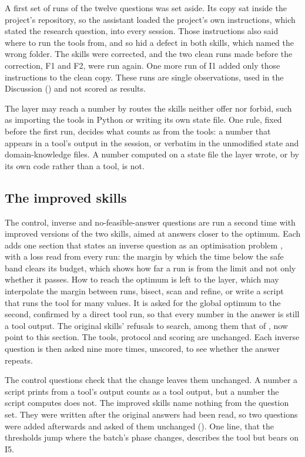   A first set of runs of the twelve questions was set aside. Its copy sat inside the project's
  repository, so the assistant loaded the project's own instructions, which stated the research
  question, into every session. Those instructions also said where to run the tools from, and so
  hid a defect in both skills, which named the wrong folder. The skills were corrected, and the
  two clean runs made before the correction, F1 and F2, were run again. One more run of I1 added
  only those instructions to the clean copy. These runs are single observations, used in the
  Discussion () and not scored as results.

  The layer may reach a number by routes the skills neither offer nor forbid, such as importing the
  tools in Python or writing its own state file. One rule, fixed before the first run, decides what
  counts as from the tools: a number that appears in a tool's output in the session, or verbatim in
  the unmodified state and domain-knowledge files. A number computed on a state file the
  layer wrote, or by its own code rather than a tool, is not.

  \subsection{The improved skills}
  \label{sec:improved}

  The control, inverse and no-feasible-answer questions are run a second time with improved
  versions of the two skills, aimed at answers closer to the optimum. Each adds one section that states an inverse question as an optimisation
  problem \cite{boyd2004convex}, with a loss read from every run: the margin by which the time
  below the safe band clears its budget, which shows how far a run is from the limit and not only
  whether it passes. How to reach the optimum is left to the layer, which may interpolate the
  margin between runs, bisect, scan and refine, or write a script that runs the tool for many
  values. It is asked for the global optimum to the second, confirmed by a direct tool run, so
  that every number in the answer is still a tool output. The original skills' refusals to search,
  among them that of , now point to this section. The tools, protocol and scoring
  are unchanged. Each inverse question is then asked nine more times, unscored, to see whether
  the answer repeats.

  The control questions check that the change leaves them unchanged. A number a script prints from a tool's output counts as a tool
  output, but a number the script computes does not. The improved skills name nothing from
  the question set. They were written after the original answers had been read, so two
  questions were added afterwards and asked of them unchanged (). One line, that the thresholds jump where the batch's phase
  changes, describes the tool but bears on I5.

